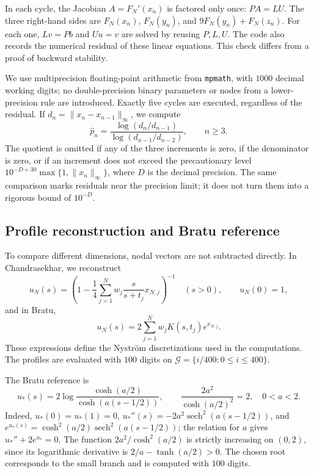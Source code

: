 \documentclass[11pt,a4paper]{article}
\numberwithin{equation}{section}
\numberwithin{table}{section}
\theoremstyle{plain}
\theoremstyle{definition}\newtheorem{definition}[theorem]{Definition}
\theoremstyle{remark}\newtheorem{remark}[theorem]{Remark}
\begin{document}
In each cycle, the Jacobian $A=F_N'(x_n)$ is factored only once:
$PA=LU$. The three right-hand sides are $F_N(x_n)$, $F_N(y_n)$,
and $9F_N(y_n)+F_N(z_n)$.
For each one, $Lv=Pb$ and $Uu=v$ are solved by reusing $P,L,U$.
The code also records the numerical residual of these linear equations.
This check differs from a proof of backward stability.

We use multiprecision floating-point arithmetic from \texttt{mpmath},
with $1000$ decimal working digits; no double-precision binary
parameters or nodes from a lower-precision rule are introduced.
Exactly five cycles are executed, regardless of the residual.
If $d_n=\|x_n-x_{n-1}\|_\infty$, we compute
\[
 \widehat p_n=\frac{\log(d_n/d_{n-1})}{\log(d_{n-1}/d_{n-2})},\qquad n\geq3.
\]
The quotient is omitted if any of the three increments is zero,
if the denominator is zero, or if an increment does not exceed the
precautionary level $10^{-D+30}\max\{1,\|x_n\|_\infty\}$, where $D$
is the decimal precision. The same comparison marks residuals near
the precision limit; it does not turn them into a rigorous bound
of $10^{-D}$.

\subsection{Profile reconstruction and Bratu reference}
To compare different dimensions, nodal vectors are not subtracted
directly. In Chandrasekhar, we reconstruct
\begin{equation}
 u_N(s)=\left(1-\frac14\sum_{j=1}^Nw_j\frac{s}{s+t_j}x_{N,j}\right)^{-1}
 \quad(s>0),\qquad u_N(0)=1,
 \label{supp:eq:chandra-profile}
\end{equation}
and in Bratu,
\begin{equation}
 u_N(s)=2\sum_{j=1}^Nw_jK(s,t_j)e^{x_{N,j}}.
 \label{supp:eq:bratu-profile}
\end{equation}
These expressions define the Nystr\"om discretizations used in the computations.
The profiles are evaluated with $100$ digits on
$\mathcal G=\{i/400:0\leq i\leq400\}$.

The Bratu reference is
\begin{equation}
 u_*(s)=2\log\frac{\cosh(a/2)}{\cosh(a(s-1/2))},\qquad
 \frac{2a^2}{\cosh(a/2)^2}=2,\quad 0<a<2.
 \label{supp:eq:bratu-exact}
\end{equation}
Indeed, $u_*(0)=u_*(1)=0$,
$u_*''(s)=-2a^2\operatorname{sech}^2(a(s-1/2))$, and
$e^{u_*(s)}=\cosh^2(a/2)\operatorname{sech}^2(a(s-1/2))$;
the relation for $a$ gives $u_*''+2e^{u_*}=0$.
The function $2a^2/\cosh^2(a/2)$ is strictly increasing on $(0,2)$,
since its logarithmic derivative is $2/a-\tanh(a/2)>0$.
The chosen root corresponds to the small branch and is computed
with $100$ digits.
\end{document}
